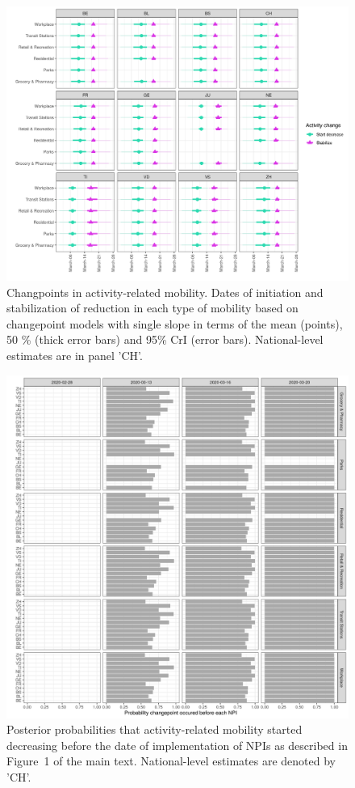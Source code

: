 \begin{figure}[!htb]
    \centering
    \includegraphics[width = .8\textwidth]{fig_covid-switzerland-npi/fig_supp/mob_change_dates.png}
    \caption[Changpoints in activity-related mobility]{Changpoints in activity-related mobility. Dates of initiation and stabilization of reduction in each type of mobility based on changepoint models with single slope in terms of the mean (points), 50 \% (thick error bars) and 95\% CrI (error bars). National-level estimates are in panel 'CH'.}
    \label{fig:mobchangedates}
\end{figure}

\begin{figure}[!htb]
    \centering
    \includegraphics[width = .8\textwidth]{fig_covid-switzerland-npi/fig_supp/mob_change_prob.png}
    \caption[Probabilities that  mobility started decreasing before the date of NPIs]{Posterior probabilities that activity-related mobility started decreasing before the date of implementation of NPIs as described in Figure~1 of the main text. National-level estimates are denoted by 'CH'.}
    \label{fig:mobchangeprob}
\end{figure}


